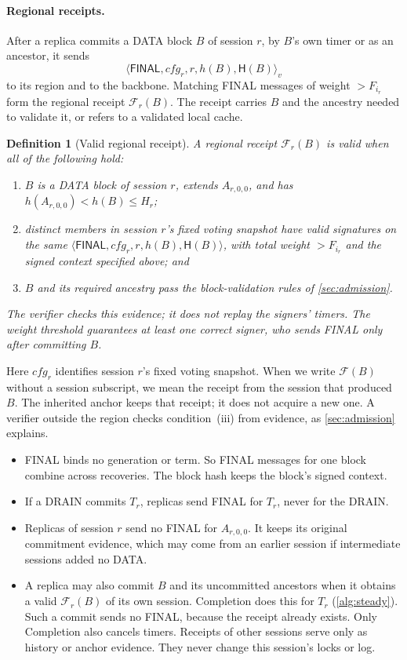 \documentclass[11pt,a4paper]{article}
\newif\ifrevmarks
\newcommand{\Rv}[1]{\ifrevmarks\leavevmode{\color{rvBlue}#1}\else#1\fi}
\newcommand{\Cid}[1]{\ifrevmarks\textsuperscript{\hyperlink{chg:#1}{\color{rvBlue}\sffamily\scriptsize#1}}\fi}
\newcommand{\FC}{\mathcal F}
\newcommand{\Hash}{\mathsf H}
\newcommand{\tagg}[1]{\ensuremath{\mathsf{#1}}}
\newtheorem{definition}{Definition}[section]
\begin{document}
\paragraph{Regional receipts.}
After a replica commits a DATA block $B$ of session $r$, by $B$'s own
timer or as an ancestor, it sends
\[
 \langle\tagg{FINAL},\mathit{cfg}_r,r,h(B),\Hash(B)\rangle_v
\]
to its region and to the backbone. Matching FINAL messages of weight
$>F_{i_r}$ form the regional receipt $\FC_r(B)$. The receipt carries $B$ and the ancestry needed to validate it, or
refers to a validated local cache.

\begin{definition}[Valid regional receipt]
\label{def:receipt}
A regional receipt $\FC_r(B)$ is valid when all of the following hold:
\begin{enumerate}[label=(\roman*)]
\item $B$ is a DATA block of session $r$, extends $A_{r,0,0}$, and has
$h(A_{r,0,0})<h(B)\le H_r$;
\item distinct members in session $r$'s fixed voting snapshot have
valid signatures on the same
$\langle\tagg{FINAL},\mathit{cfg}_r,r,h(B),\Hash(B)\rangle$,
with total weight $>F_{i_r}$ and the signed context specified above; and
\item $B$ and its required ancestry pass the block-validation rules of
\cref{sec:admission}.
\end{enumerate}
The verifier checks this evidence; it does not replay the signers'
timers. The weight threshold guarantees at least one correct signer,
who sends FINAL only after committing $B$.
\end{definition}
Here $\mathit{cfg}_r$ identifies session $r$'s fixed voting snapshot.
When we write $\FC(B)$ without a session subscript, we mean the receipt
from the session that produced $B$. The inherited anchor keeps that
receipt; it does not acquire a new one. \Rv{A verifier outside
the region checks condition~(iii) from evidence, as
\cref{sec:admission} explains.}
\begin{itemize}
\item FINAL binds no generation or term. So FINAL messages for one block
combine across recoveries. The block hash keeps the block's signed
context.
\item If a DRAIN commits $T_r$, replicas send FINAL for $T_r$, never for
the DRAIN.
\item Replicas of session $r$ send no FINAL for $A_{r,0,0}$. It keeps its original commitment evidence, which may come from an
earlier session if intermediate sessions added no DATA.
\item A replica may \Rv{also commit $B$ and its uncommitted
ancestors when it obtains a valid $\FC_r(B)$} of its own session.
\Rv{Completion does this for $T_r$ (\cref{alg:steady}). Such a commit
sends no FINAL, because the receipt already exists. Only Completion
also cancels timers.} Receipts of other sessions serve only as history or anchor
evidence. They never change this session's locks or log.
\end{itemize}
\end{document}
